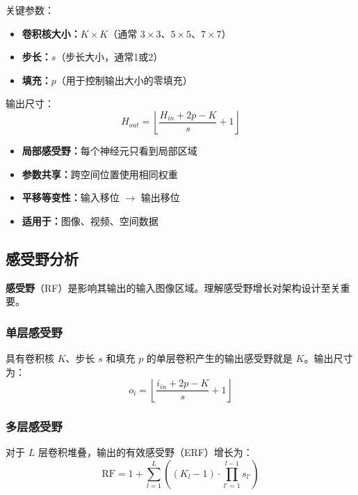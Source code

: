 关键参数：
\begin{itemize}
    \item \textbf{卷积核大小：}$K \times K$（通常 $3 \times 3$、$5 \times 5$、$7 \times 7$）
    \item \textbf{步长：}$s$（步长大小，通常1或2）
    \item \textbf{填充：}$p$（用于控制输出大小的零填充）
\end{itemize}

输出尺寸：
\begin{equation}
H_{out} = \left\lfloor \frac{H_{in} + 2p - K}{s} + 1 \right\rfloor
\end{equation}

\begin{properties}[CNN优势]
\begin{itemize}
    \item \textbf{局部感受野：}每个神经元只看到局部区域
    \item \textbf{参数共享：}跨空间位置使用相同权重
    \item \textbf{平移等变性：}输入移位 $\rightarrow$ 输出移位
    \item \textbf{适用于：}图像、视频、空间数据
\end{itemize}
\end{properties}

\subsection{感受野分析}

\textbf{感受野}（RF）是影响其输出的输入图像区域。理解感受野增长对架构设计至关重要。

\subsubsection{单层感受野}

具有卷积核 $K$、步长 $s$ 和填充 $p$ 的单层卷积产生的输出感受野就是 $K$。输出尺寸为：
\begin{equation}
o_i = \left\lfloor \frac{i_{in} + 2p - K}{s} + 1 \right\rfloor
\end{equation}

\subsubsection{多层感受野}

对于 $L$ 层卷积堆叠，输出的有效感受野（ERF）增长为：
\begin{equation}
\text{RF} = 1 + \sum_{l=1}^{L} \left( (K_l - 1) \cdot \prod_{l'=1}^{l-1} s_{l'} \right)
\end{equation}

